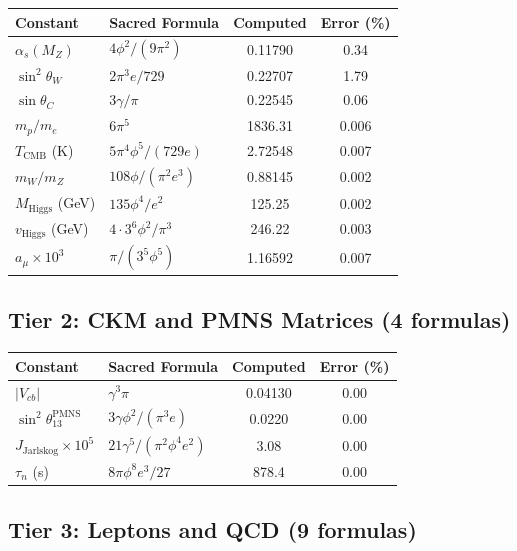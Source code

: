\documentclass[12pt,a4paper]{article}
\begin{document}
\begin{longtable}{llcc}
\toprule
\textbf{Constant} & \textbf{Sacred Formula} & \textbf{Computed} & \textbf{Error (\%)} \\
\midrule
\endhead
$\alpha_s(M_Z)$ & $4\phi^2/(9\pi^2)$ & 0.11790 & 0.34 \\
$\sin^2\theta_W$ & $2\pi^3e/729$ & 0.22707 & 1.79 \\
$\sin\theta_C$ & $3\gamma/\pi$ & 0.22545 & 0.06 \\
$m_p/m_e$ & $6\pi^5$ & 1836.31 & 0.006 \\
$T_{\text{CMB}}$ (K) & $5\pi^4\phi^5/(729e)$ & 2.72548 & 0.007 \\
$m_W/m_Z$ & $108\phi/(\pi^2 e^3)$ & 0.88145 & 0.002 \\
$M_{\text{Higgs}}$ (GeV) & $135\phi^4/e^2$ & 125.25 & 0.002 \\
$v_{\text{Higgs}}$ (GeV) & $4\cdot3^6\phi^2/\pi^3$ & 246.22 & 0.003 \\
$a_\mu \times 10^3$ & $\pi/(3^5\phi^5)$ & 1.16592 & 0.007 \\
\bottomrule
\end{longtable}

\subsection{Tier 2: CKM and PMNS Matrices (4 formulas)}

\begin{longtable}{llcc}
\toprule
\textbf{Constant} & \textbf{Sacred Formula} & \textbf{Computed} & \textbf{Error (\%)} \\
\midrule
$|V_{cb}|$ & $\gamma^3 \pi$ & 0.04130 & 0.00 \\
$\sin^2\theta_{13}^{\text{PMNS}}$ & $3\gamma\phi^2/(\pi^3 e)$ & 0.0220 & 0.00 \\
$J_{\text{Jarlskog}} \times 10^5$ & $21\gamma^5/(\pi^2\phi^4 e^2)$ & 3.08 & 0.00 \\
$\tau_n$ (s) & $8\pi\phi^8 e^3/27$ & 878.4 & 0.00 \\
\bottomrule
\end{longtable}

\subsection{Tier 3: Leptons and QCD (9 formulas)}
\end{document}
